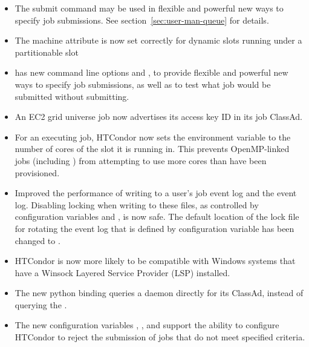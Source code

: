 \begin{itemize}

\item The  submit command may be used in
flexible and powerful new ways to specify job submissions.
See section~\ref{sec:user-man-queue} for details.

\item The machine attribute  is now set correctly
for dynamic slots running under a partitionable slot

\item {} has new command line options  
and ,
to provide flexible and powerful new ways to specify job submissions,
as well as to test what job would be submitted without submitting.

\item An EC2 grid universe job now advertises its access key ID in 
its job ClassAd.

\item For an executing job, HTCondor now sets the environment variable 
 to the number of cores of the slot it is running in.
This prevents OpenMP-linked jobs (including ) 
from attempting to use more cores than have been provisioned.

\item Improved the performance of writing to a user's job event log 
and the event log.
Disabling locking when writing to these files,
as controlled by configuration variables 
and , is now safe.
The default location of the lock file for rotating the event log
that is defined by configuration variable
 has been changed to
.

\item HTCondor is now more likely to be compatible with Windows systems
that have a Winsock Layered Service Provider (LSP) installed.

\item The new  python binding queries a daemon
directly for its ClassAd, 
instead of querying the .

\item The new configuration variables ,
, 
and 
support the ability to configure HTCondor to reject the submission
of jobs that do not meet specified criteria.


\end{itemize}
